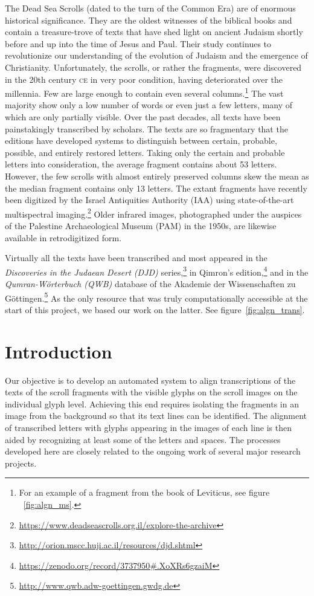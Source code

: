 The Dead Sea Scrolls (dated to the turn of the Common Era) are of enormous
historical significance.  They are the oldest witnesses of the biblical books
and contain a treasure-trove of texts that have shed light on ancient Judaism
shortly before and up into the time of Jesus and Paul.  Their study continues
to revolutionize our understanding of the evolution of Judaism and the
emergence of Christianity.  Unfortunately, the scrolls, or rather the
fragments, were discovered in the 20th century \textsc{ce} in very poor
condition, having deteriorated over the millennia.  Few are large enough to
contain even several columns.\footnote{For an example of a fragment from the
book of Leviticus, see figure ~\ref{fig:algn_ms}.} The vast majority show only a low
number of words or even just a few letters, many of which are only partially
visible.  Over the past decades, all texts have been painstakingly transcribed
by scholars.  The texts are so fragmentary that the editions have developed
systems to distinguish between certain, probable, possible, and entirely
restored letters.  Taking only the certain and probable letters into
consideration, the average fragment contains about 53 letters.  However, the
few scrolls with almost entirely preserved columns skew the mean as the median
fragment contains only 13 letters.  The extant fragments have recently been
digitized by the Israel Antiquities Authority (IAA) using state-of-the-art
multispectral
imaging.\footnote{\url{https://www.deadseascrolls.org.il/explore-the-archive}}
Older infrared images, photographed under the auspices of the Palestine
Archaeological Museum (PAM) in the 1950s, are likewise available in
retrodigitized form.

Virtually all the texts have been transcribed and most appeared in the
\textit{Discoveries in the Judaean Desert (DJD)}
series,\footnote{\url{http://orion.mscc.huji.ac.il/resources/djd.shtml}} in
Qimron's
edition,\footnote{\url{https://zenodo.org/record/3737950\#.XoXRs6gzaiM}} and in
the \textit{Qumran-Wörterbuch (QWB)} database of the Akademie der
Wissenschaften zu
Göttingen.\footnote{\url{http://www.qwb.adw-goettingen.gwdg.de}} As the only
resource that was truly computationally accessible at the start of this
project, we based our work on the latter. See figure~\ref{fig:algn_trans}.

\section{Introduction}

Our objective is to develop an automated system to align transcriptions of the
texts of the scroll fragments with the visible glyphs on the scroll images on
the individual glyph level.  Achieving this end requires isolating the
fragments in an image from the background so that its text lines can be
identified.  The alignment of transcribed letters with glyphs appearing in the
images of each line is then aided by recognizing at least some of the letters
and spaces.  The processes developed here are closely related to the ongoing
work of several major research projects.

